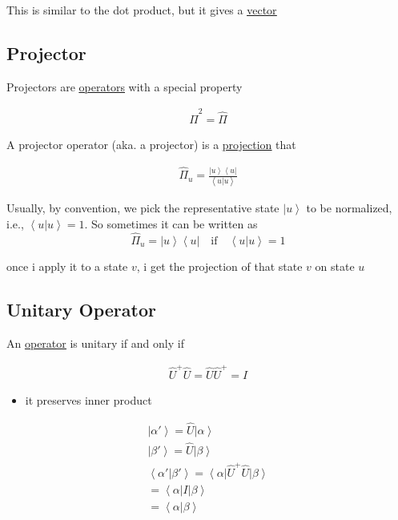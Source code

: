 \documentclass[
]{article}
\providecommand{\tightlist}{%
  \setlength{\itemsep}{0pt}\setlength{\parskip}{0pt}}
\let\oldhyperref\hyperref
\renewcommand{\hyperref}[2][]{\oldhyperref[#1]{\underline{#2}}}
\providecommand{\ket}[1]{\left\lvert #1 \right\rangle}
\providecommand{\bra}[1]{\left\langle #1 \right\rvert}
\providecommand{\braket}[1]{\left\langle #1 \right\rangle}
\begin{document}
This is similar to the dot product, but it gives a
\hyperref[vectors]{vector}

\subsection{Projector}\label{projectors}
Projectors are
\hyperref[operators]{operators}
with a special property

\begin{gather*}
	\hat{\Pi}^2=\hat{\Pi}
\end{gather*}

A projector operator (aka. a projector) is a
\hyperref[projections]{projection}
that

\begin{gather*}
	\hat{\Pi}_u=\frac{\ket{u}\bra{u}}{\braket{u|u}}
\end{gather*}

Usually, by convention, we pick the representative state \(\ket{u}\) to be normalized, i.e., \(\braket{u|u}=1\).
So sometimes it can be written as
\[
	\hat{\Pi}_u=\ket{u}\bra{u}\quad \text{if} \quad\braket{u|u}=1
\]

once i apply it to a state \(v\), i get the projection of that state
\(v\) on state \(u\)

\subsection{Unitary Operator}\label{unitary-operator}

An \hyperref[operators]{operator} is unitary if and only if

\begin{gather*}
	\hat{U}^+\hat{U}=\hat{U}\hat{U}^+=I
\end{gather*}

\begin{itemize}
	\tightlist
	\item
	      it preserves inner product
\end{itemize}

\begin{gather*}
	\ket{\alpha '}=\hat{U}\ket{\alpha}\\
	\ket{\beta'}=\hat{U}\ket{\beta}\\
	\braket{\alpha'|\beta'}=\bra{\alpha}\hat{U}^+\hat{U}\ket{\beta}\\
	=\bra{\alpha}I\ket{\beta}\\
	=\braket{\alpha|\beta}
\end{gather*}
\end{document}
